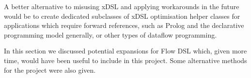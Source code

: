 A better alternative to misusing xDSL and applying workarounds in the future would be to create dedicated subclasses of xDSL optimisation helper classes for applications which require forward references, such as Prolog and the declarative programming model generally, or other types of dataflow programming.

\par\noindent\hrulefill\par

In this section we discussed potential expansions for Flow DSL which, given more time, would have been useful to include in this project. Some alternative methods for the project were also given.
